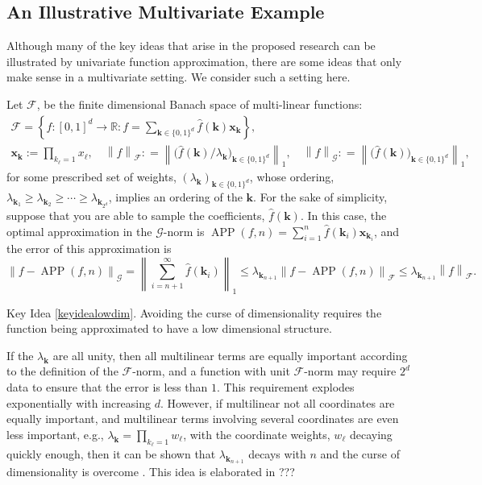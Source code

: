 \documentclass[11pt]{NSFamsart}
\newcommand{\hf}{\widehat{f}}
\newcommand{\reals}{{\mathbb{R}}}
\DeclareMathOperator{\APP}{APP}
\newcommand{\bx}{{\boldsymbol{x}}}
\newcommand{\bk}{{\boldsymbol{k}}}
\newcommand{\calf}{{\mathcal{F}}}
\newcommand{\calg}{{\mathcal{G}}}
\newcommand{\norm}[2][{}]{\ensuremath{\left \lVert #2 \right \rVert}_{#1}}
\newcommand{\keyidealowdimtext}{Avoiding the curse of dimensionality requires the function being approximated to have a low dimensional structure.}
\newcommand{\repeatkeyidea}[2]{\begin{itshape}Key Idea \ref{#1}. #2\end{itshape}}
\begin{document}
\subsection{An Illustrative Multivariate Example}
Although many of the key ideas that arise in the proposed research can be illustrated by univariate function approximation, there are some ideas that only make sense in a multivariate setting.  We consider such a setting here.

Let $\calf$, be the finite dimensional Banach space of multi-linear functions:
\begin{subequations} \label{ex:multilin}
\begin{gather}
    \calf = \left\{f:[0,1]^d \to \reals : f = \sum_{\bk \in \{0,1\}^d} \hf(\bk) \bx_{\bk} \right \}, 
    \\ 
    \bx_{\bk} := \prod_{k_\ell =1 }x_\ell, \quad 
    \norm[\calf]{f} : = \norm[1]{\bigl(\hf(\bk)/\lambda_\bk\bigr)_{\bk \in \{0,1\}^d}},  \quad \norm[\calg]{f} : = \norm[1]{\bigl(\hf(\bk))_{\bk \in \{0,1\}^d}},
\end{gather}
\end{subequations}
for some prescribed set of weights, $(\lambda_\bk)_{\bk \in \{0,1\}^d}$, whose ordering, $\lambda_{\bk_1} \ge \lambda_{\bk_2} \ge \cdots \ge \lambda_{\bk_{2^d}}$, implies an ordering of the $\bk$.  For the sake of simplicity, suppose that you are able to sample the coefficients, $\hf(\bk)$.  In this case, the optimal approximation in the $\calg$-norm is $\APP(f,n) = \sum_{i=1}^n \hf(\bk_i) \bx_{\bk_i}$, and the error of this approximation is 
\begin{equation}
    \norm[\calg]{f - \APP(f,n)} = \norm[1]{\sum_{i = n+1}^{\infty} \hf(\bk_i)} \le \lambda_{\bk_{n+1}} \norm[\calf]{f - \APP(f,n)} \le \lambda_{\bk_{n+1}} \norm[\calf]{f}.
\end{equation}

\repeatkeyidea{keyidealowdim}{\keyidealowdimtext}
If the $\lambda_\bk$ are all unity, then all multilinear terms are equally important according to the definition of the $\calf$-norm, and a function with unit $\calf$-norm may require $2^d$ data to ensure that the error is less than $1$.  This requirement explodes exponentially with increasing $d$.  However, if multilinear not all coordinates are equally important, and multilinear terms involving several coordinates are even less important, e.g., $\lambda_{\bk} = \prod_{k_\ell =1} w_\ell$, with the coordinate weights, $w_\ell$ decaying quickly enough, then it can be shown that $\lambda_{\bk_{n+1}}$ decays with $n$ and the curse of dimensionality is overcome \cite{DinEtal20a}.  This idea is elaborated in ???
\end{document}
